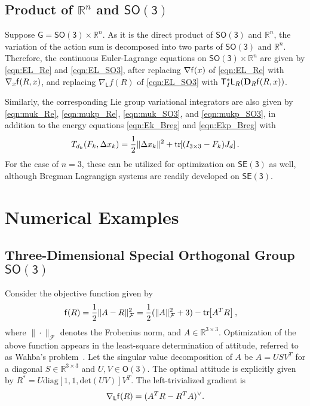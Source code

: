\documentclass[letterpaper, 10pt, conference]{ieeeconf}
\newcommand{\bracket}[1]{\ensuremath{\left[ #1 \right]}}
\newcommand{\tr}[1]{\mbox{tr}\ensuremath{\negthickspace\bracket{#1}}}
\newcommand{\G}{\ensuremath{\mathsf{G}}}
\newcommand{\SO}{\ensuremath{\mathsf{SO(3)}}}
\newcommand{\T}{\ensuremath{\mathsf{T}}}
\renewcommand{\L}{\ensuremath{\mathsf{L}}}
\newcommand{\SE}{\ensuremath{\mathsf{SE(3)}}}
\renewcommand{\Re}{\ensuremath{\mathbb{R}}}
\newcommand{\D}{\ensuremath{\mathbf{D}}}
\begin{document}
\subsection{Product of $\Re^n$ and $\SO$}

Suppose $\G=\SO\times \Re^n$.
As it is the direct product of $\SO$ and $\Re^n$, the variation of the action sum is decomposed into two parts of $\SO$ and $\Re^n$. 
Therefore, the continuous Euler-Lagrange equations on $\SO\times\Re^n$ are given by \eqref{eqn:EL_Re} and \eqref{eqn:EL_SO3}, after replacing $\nabla \mathsf{f}(x)$ of \eqref{eqn:EL_Re} with $\nabla_x \mathsf{f}(R,x)$, and replacing $\nabla_\L f(R)$ of \eqref{eqn:EL_SO3} with $\T^*_I\L_R(\D_R\obj(R,x))$.

Similarly, the corresponding Lie group variational integrators are also given by \eqref{eqn:muk_Re}, \eqref{eqn:mukp_Re}, \eqref{eqn:muk_SO3}, and \eqref{eqn:mukp_SO3}, in addition to the energy equations \eqref{eqn:Ek_Breg} and \eqref{eqn:Ekp_Breg} with
\begin{align*}
    T_{d_k}(F_k,\Delta x_k) = \frac{1}{2}\|\Delta x_k\|^2 + \tr{(I_{3\times 3}-F_k)J_d}.
\end{align*}
For the case of $n=3$, these can be utilized for optimization on $\SE$ as well, although Bregman Lagrangign systems are readily developed on $\SE$.

\section{Numerical Examples}

\subsection{Three-Dimensional Special Orthogonal Group $\SO$}

Consider the objective function given by
\begin{align}
    \obj (R) & = \frac{1}{2}\| A- R\|^2_{\mathcal{F}}  %
    =\frac{1}{2}(\|A\|^2_{\mathcal{F}} + 3) - \tr{A^T R},\label{eqn:obj_SO3}
\end{align}
where $\|\cdot\|_{\mathcal{F}}$ denotes the Frobenius norm, and $A\in\Re^{3\times 3}$.
Optimization of the above function appears in the least-square determination of attitude, referred to as Wahba's problem~\cite{WahSR65}. 
Let the singular value decomposition of $A$ be $A=USV^T$ for a diagonal $S\in\Re^{3\times 3}$ and $U,V\in\mathsf{O}(3)$.
The optimal attitude is explicitly given by $R^* =  U \mathrm{diag}[1,1,\mathrm{det}(UV)] V^T$.
The left-trivialized gradient is 
\begin{align*}
    \nabla_\L \obj(R)  = (A^T R - R^T A)^\vee.
\end{align*}
\end{document}
